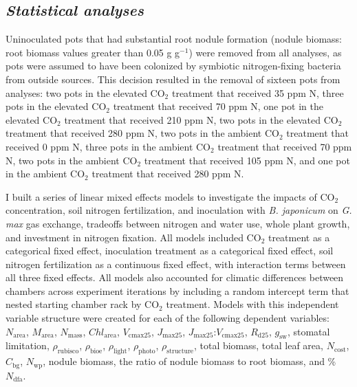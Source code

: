 \subsection{\textit{Statistical analyses}}
\noindent Uninoculated pots that had substantial root nodule formation (nodule biomass: root biomass values greater than 0.05 g g$^{-1}$) were removed from all analyses, as pots were assumed to have been colonized by symbiotic nitrogen-fixing bacteria from outside sources. This decision resulted in the removal of sixteen pots from analyses: two pots in the elevated CO$_2$ treatment that received 35 ppm N, three pots in the elevated CO$_2$ treatment that received 70 ppm N, one pot in the elevated CO$_2$ treatment that received 210 ppm N, two pots in the elevated CO$_2$ treatment that received 280 ppm N, two pots in the ambient CO$_2$ treatment that received 0 ppm N, three pots in the ambient CO$_2$ treatment that received 70 ppm N, two pots in the ambient CO$_2$ treatment that received 105 ppm N, and one pot in the ambient CO$_2$ treatment that received 280 ppm N.

I built a series of linear mixed effects models to investigate the impacts of CO$_2$ concentration, soil nitrogen fertilization, and inoculation with \textit{B. japonicum} on \textit{G. max} gas exchange, tradeoffs between nitrogen and water use, whole plant growth, and investment in nitrogen fixation. All models included CO$_2$ treatment as a categorical fixed effect, inoculation treatment as a categorical fixed effect, soil nitrogen fertilization as a continuous fixed effect, with interaction terms between all three fixed effects. All models also accounted for climatic differences between chambers across experiment iterations by including a random intercept term that nested starting chamber rack by CO$_2$ treatment. Models with this independent variable structure were created for each of the following dependent variables: $N_\mathrm{area}$, $M_\mathrm{area}$, $N_\mathrm{mass}$, $Chl_\mathrm{area}$, $V_\mathrm{cmax25}$, $J_\mathrm{max25}$, $J_\mathrm{max25}$:$V_\mathrm{cmax25}$, $R_\mathrm{d25}$, $g_\mathrm{sw}$, stomatal limitation, $\rho_\mathrm{rubisco}$, $\rho_\mathrm{bioe}$, $\rho_\mathrm{light}$, $\rho_\mathrm{photo}$, $\rho_\mathrm{structure}$, total biomass, total leaf area, $N_\mathrm{cost}$, $C_\mathrm{bg}$, $N_\mathrm{wp}$, nodule biomass, the ratio of nodule biomass to root biomass, and \%$N_\mathrm{dfa}$.

